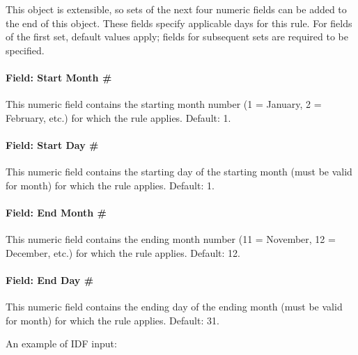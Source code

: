 This object is extensible, so sets of the next four numeric fields can be added to the end of this object.
These fields specify applicable days for this rule.
For fields of the first set, default values apply; fields for subsequent sets are required to be specified.

\paragraph{Field: Start Month \#}\label{field-start-month-scheduleweekrule}

This numeric field contains the starting month number (1 = January, 2 = February, etc.) for which the rule applies.
Default: 1.

\paragraph{Field: Start Day \#}\label{field-date-start-day-scheduleweekrule}

This numeric field contains the starting day of the starting month (must be valid for month) for which the rule applies.
Default: 1.

\paragraph{Field: End Month \#}\label{field-end-month-scheduleweekrule}

This numeric field contains the ending month number (11 = November, 12 = December, etc.) for which the rule applies.
Default: 12.

\paragraph{Field: End Day \#}\label{field-end-day-scheduleweekrule}

This numeric field contains the ending day of the ending month (must be valid for month) for which the rule applies.
Default: 31.

An example of IDF input:

